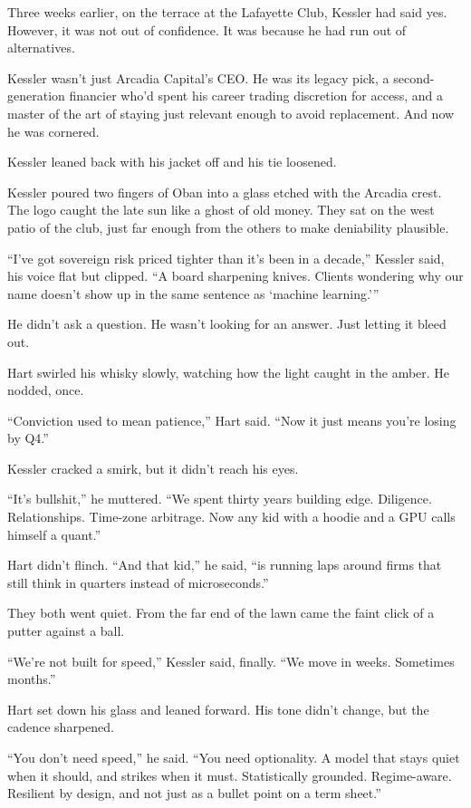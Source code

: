 Three weeks earlier, on the terrace at the Lafayette Club,
Kessler had said yes. However, it was not out of confidence. It was because he had run out of alternatives.

Kessler wasn’t just Arcadia Capital’s CEO. 
He was its legacy pick, a second-generation financier who’d spent his career trading discretion for access, and a master 
of the art of staying just relevant enough to avoid replacement. And now he was cornered. 

Kessler leaned back with his jacket off and his tie loosened.

Kessler poured two fingers of Oban into a glass etched with the Arcadia crest. The logo caught the late sun like a ghost 
of old money.  They sat on the west patio of the club, 
just far enough from the others to make deniability plausible.

“I’ve got sovereign risk priced tighter than it’s been in a decade,” Kessler said, his voice flat but clipped. “A board 
sharpening knives. Clients wondering why our name doesn’t show up in the same sentence as ‘machine learning.’”

He didn’t ask a question. He wasn’t looking for an answer. Just letting it bleed out.

Hart swirled his whisky slowly, watching how the light caught in the amber. He nodded, once.

“Conviction used to mean patience,” Hart said. “Now it just means you’re losing by Q4.”

Kessler cracked a smirk, but it didn’t reach his eyes.

“It’s bullshit,” he muttered. “We spent thirty years building edge. Diligence. Relationships. Time-zone 
arbitrage.  Now any kid with a hoodie and a GPU calls himself a quant.”

Hart didn’t flinch. “And that kid,” he said, “is running laps around firms that still think in quarters instead 
of microseconds.”

They both went quiet. From the far end of the lawn came the faint click of a putter against a ball.

“We’re not built for speed,” Kessler said, finally. “We move in weeks. Sometimes months.”

Hart set down his glass and leaned forward. His tone didn’t change, but the cadence sharpened.

“You don’t need speed,” he said. “You need optionality. A model that stays quiet when it should, and strikes 
when it must. Statistically grounded. Regime-aware. Resilient by design, and not just as a bullet point on 
a term sheet.”

